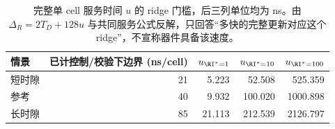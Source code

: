 \begin{table}[htbp]\centering\small
\begin{tabular}{@{}lrrrr@{}}\toprule
情景 & 已计控制/校验下边界 (ns/cell) & $u_{\RI^*=1}$ & $u_{\RI^*=10}$ & $u_{\RI^*=100}$\\\midrule
短时隙 & 21 & 5.223 & 52.508 & 525.359\\
参考 & 40 & 9.932 & 100.020 & 1000.898\\
长时隙 & 85 & 21.113 & 212.539 & 2126.797\\
\bottomrule\end{tabular}
\caption{完整单 cell 服务时间 $u$ 的 ridge 门槛，后三列单位均为 ns。由 $\Delta_R=2T_D+128u$ 与共同服务公式反解，只回答“多快的完整更新对应这个 ridge”，不宣称器件具备该速度。}\label{tab:threshold}\end{table}

